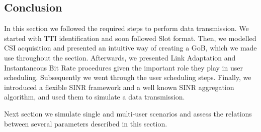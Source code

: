 \subsection*{Conclusion}

In this section we followed the required steps to perform data transmission. We started with TTI identification and soon followed Slot format. Then, we modelled CSI acquisition and presented an intuitive way of creating a \ac{GoB}, which we made use throughout the section. Afterwards, we presented Link Adaptation and Instantaneous Bit Rate procedures given the important role they play in user scheduling. Subsequently we went through the user scheduling steps. Finally, we introduced a flexible SINR framework and a well known SINR aggregation algorithm, and used them to simulate a data transmission.


Next section we simulate single and multi-user scenarios and assess the relations between several parameters described in this section. 

